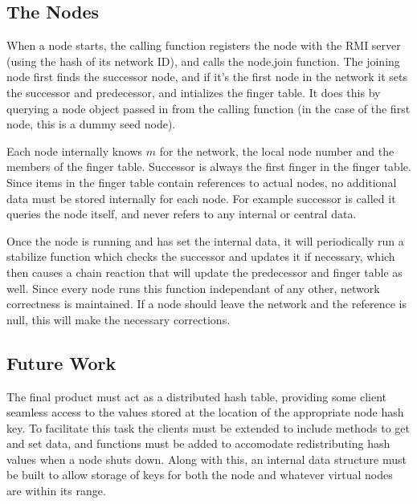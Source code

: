 \documentclass{scrartcl}
\begin{document}
\subsection*{The Nodes}
When a node starts, the calling function registers the node with the RMI server (using the hash of its network ID), and calls the node.join function. The joining node first finds the successor node, and if it's the first node in the network it sets the successor and predecessor, and intializes the finger table. It does this by querying a node object passed in from the calling function (in the case of the first node, this is a dummy seed node).\\
\par Each node internally knows $m$ for the network, the local node number and the members of the finger table. Successor is always the first finger in the finger table. Since items in the finger table contain references to actual nodes, no additional data must be stored internally for each node. For example successor is called it queries the node itself, and never refers to any internal or central data.\\
\par Once the node is running and has set the internal data, it will periodically run a stabilize function which checks the successor and updates it if necessary, which then causes a chain reaction that will update the predecessor and finger table as well. Since every node runs this function independant of any other, network correctness is maintained. If a node should leave the network and the reference is null, this will make the necessary corrections.

\subsection*{Future Work}
\indent The final product must act as a distributed hash table, providing some client seamless access to the values stored at the location of the appropriate node hash key. To facilitate this task the clients must be extended to include methods to get and set data, and functions must be added to accomodate redistributing hash values when a node shuts down. Along with this, an internal data structure must be built to allow storage of keys for both the node and whatever virtual nodes are within its range.
\end{document}

